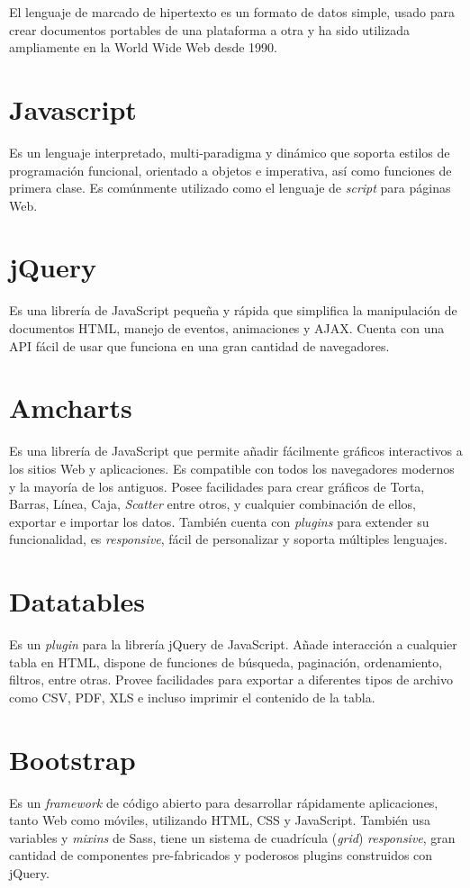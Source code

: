 El lenguaje de marcado de hipertexto es un formato de datos simple, usado para crear documentos portables de una plataforma a otra y ha sido utilizada ampliamente en la World Wide Web desde 1990. \cite{RFC1866}

\section{Javascript}

Es un lenguaje interpretado, multi-paradigma y dinámico que soporta estilos de programación funcional,  orientado a objetos e imperativa, así como funciones de primera clase. Es comúnmente utilizado como el lenguaje de \textit{script} para páginas Web. \cite{javascript}

\section{jQuery}

Es una librería de JavaScript pequeña y rápida que simplifica la manipulación de documentos HTML, manejo de eventos, animaciones y AJAX. Cuenta con una API fácil de usar que funciona en una gran cantidad de navegadores.

\section{Amcharts}

Es una librería de JavaScript que permite añadir fácilmente gráficos
interactivos a los sitios Web y aplicaciones. Es compatible con todos los
navegadores modernos y la mayoría de los antiguos. Posee facilidades para crear
gráficos de Torta, Barras, Línea, Caja, \textit{Scatter} entre otros, y
cualquier combinación de ellos, exportar e importar los datos. También cuenta
con \textit{plugins} para extender su funcionalidad, es \textit{responsive},
fácil de personalizar y soporta múltiples lenguajes. \cite{Amcharts}

\section{Datatables}

Es un \textit{plugin} para la librería jQuery de JavaScript. Añade interacción
a cualquier tabla en HTML, dispone de funciones de búsqueda, paginación,
ordenamiento, filtros, entre otras. Provee facilidades para exportar a
diferentes tipos de archivo como CSV, PDF, XLS e incluso imprimir el contenido de la tabla.

\section{Bootstrap}
Es un \textit{framework} de código abierto para desarrollar rápidamente
aplicaciones, tanto Web como móviles, utilizando HTML, CSS y JavaScript.
También usa variables y \textit{mixins} de Sass, tiene un sistema de cuadrícula
(\textit{grid}) \textit{responsive}, gran cantidad de componentes pre-fabricados y poderosos plugins construidos con  jQuery.
